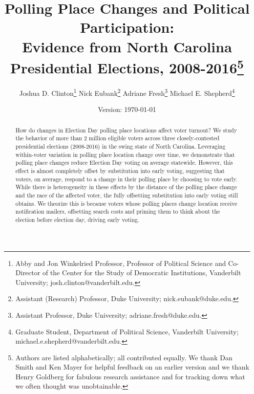 \documentclass{cup_PSRM}
\begin{document}
\doublespacing
\setlength{\parindent}{0.45in}
\setlength{\parskip}{.0in}




\title{Polling Place Changes and Political Participation:\\ Evidence from North Carolina Presidential Elections, 2008-2016\footnote{Authors are listed alphabetically; all contributed equally.  We thank Dan Smith and Ken Mayer for helpful feedback on an earlier version and we thank Henry Goldberg for fabulous research assistance and for tracking down what we often thought was unobtainable.}}

\author{Joshua D. Clinton\footnote{ \footnotesize  Abby and Jon Winkelried Professor, Professor of Political Science and Co-Director of the Center for the Study of Democratic Institutions, Vanderbilt University; josh.clinton@vanderbilt.edu. }  \hspace*{.175in} Nick Eubank\footnote{\footnotesize Assistant (Research) Professor, Duke University; nick.eubank@duke.edu. }  \hspace*{.175in} Adriane Fresh\footnote{\footnotesize Assistant Professor, Duke University; adriane.fresh@duke.edu. }\hspace*{.175in}  Michael E. Shepherd\footnote{\footnotesize Graduate Student, Department of Political Science, Vanderbilt University; michael.e.shepherd@vanderbilt.edu. }}


\date{Version: \today  \\ \vspace*{.3in} }


\maketitle
\vspace{.1in}




\begin{abstract}
\bigskip
\small
\noindent How do changes in Election Day polling place locations affect voter turnout? We study the behavior of more than 2 million eligible voters across three closely-contested presidential elections (2008-2016) in the swing state of North Carolina. Leveraging within-voter variation in polling place location change over time, we demonstrate that polling place changes reduce Election Day voting on average statewide. However, this effect is almost completely offset by substitution into early voting, suggesting that voters, on average, respond to a change in their polling place by choosing to vote early. While there is heterogeneity in these effects by the distance of the polling place change and the race of the affected voter, the fully offsetting substitution into early voting still obtains.  We theorize this is because voters whose polling places change location receive notification mailers, offsetting search costs and priming them to think about the election before election day, driving early voting.
\end{abstract}
\end{document}
